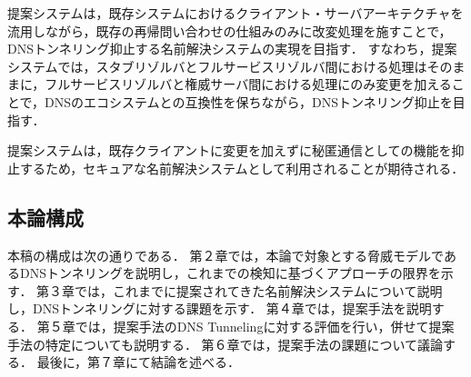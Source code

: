 提案システムは，既存システムにおけるクライアント・サーバアーキテクチャを流用しながら，既存の再帰問い合わせの仕組みのみに改変処理を施すことで，DNSトンネリング抑止する名前解決システムの実現を目指す．
すなわち，提案システムでは，スタブリゾルバとフルサービスリゾルバ間における処理はそのままに，フルサービスリゾルバと権威サーバ間における処理にのみ変更を加えることで，DNSのエコシステムとの互換性を保ちながら，DNSトンネリング抑止を目指す．

提案システムは，既存クライアントに変更を加えずに秘匿通信としての機能を抑止するため，セキュアな名前解決システムとして利用されることが期待される．





\subsection{本論構成}
本稿の構成は次の通りである．
第２章では，本論で対象とする脅威モデルであるDNSトンネリングを説明し，これまでの検知に基づくアプローチの限界を示す．
第３章では，これまでに提案されてきた名前解決システムについて説明し，DNSトンネリングに対する課題を示す．
第４章では，提案手法を説明する．
第５章では，提案手法のDNS Tunnelingに対する評価を行い，併せて提案手法の特定についても説明する．
第６章では，提案手法の課題について議論する．
最後に，第７章にて結論を述べる．
